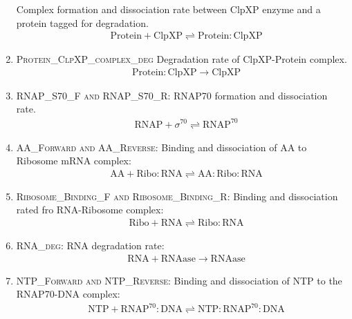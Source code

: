 \documentclass[english]{report}
\begin{document}
\begin{enumerate}
        	Complex formation and dissociation rate between ClpXP enzyme and a protein tagged for degradation.
        	\begin{align}
        	& \mathrm{Protein} + \mathrm{ClpXP} \rightleftharpoons  \mathrm{Protein:ClpXP} 
        	\end{align}        	
        	\item \textsc{Protein\_ClpXP\_complex\_deg} 
        	Degradation rate of ClpXP-Protein complex.
        	\begin{align}
        	& \mathrm{Protein:ClpXP}  \rightarrow   \mathrm{ClpXP}
        	\end{align} 
        	\item \textsc{RNAP\_S70\_F and RNAP\_S70\_R}:
        	RNAP70 formation and dissociation rate.
        	\begin{align}
        	& \mathrm{RNAP} + \sigma^{70} \rightleftharpoons   \mathrm{RNAP^{70}}
        	\end{align}
        	\item \textsc{AA\_Forward and AA\_Reverse}:
        	Binding and dissociation of AA to Ribosome mRNA complex:
        	\begin{align}
        	& \mathrm{AA} + \mathrm{Ribo:RNA}  \rightleftharpoons   \mathrm{AA}:\mathrm{Ribo:RNA}
        	\end{align}
        	\item \textsc{Ribosome\_Binding\_F and Ribosome\_Binding\_R}: Binding and dissociation rated fro RNA-Ribosome complex:
        	\begin{align}
        	& \mathrm{Ribo} + \mathrm{RNA}  \rightleftharpoons   \mathrm{Ribo:RNA}
        	\end{align}
        	\item \textsc{RNA\_deg}: RNA degradation rate:
        	\begin{align}
        	& \mathrm{RNA} + \mathrm{RNAase}  \rightarrow   \mathrm{RNAase}
        	\end{align}
        	
        	\item \textsc{NTP\_Forward and NTP\_Reverse}:
        	Binding and dissociation of NTP to the RNAP70-DNA complex:
        	\begin{align}
        	& \mathrm{NTP} + \mathrm{RNAP^{70}}:\mathrm{DNA}  \rightleftharpoons   \mathrm{NTP}:\mathrm{RNAP^{70}}:\mathrm{DNA}
        	\end{align}
			\end{enumerate}		
\end{document}
